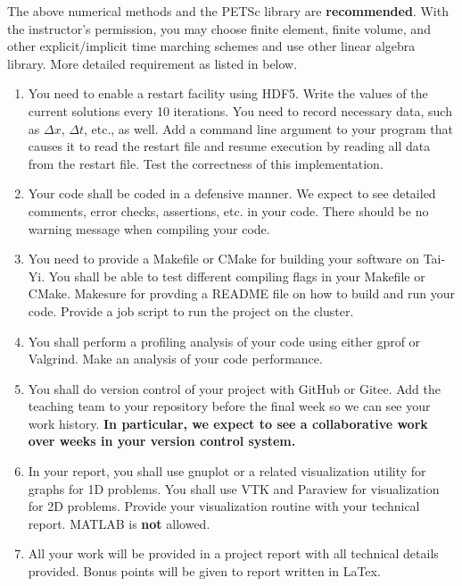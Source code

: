 \documentclass[12pt]{article}
\begin{document}
The above numerical methods and the PETSc library are \textbf{recommended}. With the instructor's permission, you may choose finite element, finite volume, and other explicit/implicit time marching schemes and use other linear algebra library. More detailed requirement as listed in below.

\begin{enumerate}
\item You need to enable a restart facility using HDF5. Write the values of the current solutions every 10 iterations. You need to record necessary data, such as $\Delta x$, $\Delta t$, etc., as well. Add a command line argument to your program that causes it to read the restart file and resume execution by reading all data from the restart file. Test the correctness of this implementation.

\item Your code shall be coded in a defensive manner. We expect to see detailed comments, error checks, assertions, etc. in your code. There should be no warning message when compiling your code.

\item You need to provide a Makefile or CMake for building your software on Tai-Yi. You shall be able to test different compiling flags in your Makefile or CMake. Makesure for provding a README file on how to build and run your code. Provide a job script to run the project on the cluster.

\item You shall perform a profiling analysis of your code using either gprof or Valgrind. Make an analysis of your code performance.


\item You shall do version control of your project with GitHub or Gitee. Add the teaching team to your repository before the final week so we can see your work history. \textbf{In particular, we expect to see a collaborative work over weeks in your version control system.}

\item In your report, you shall use gnuplot or a related visualization utility for graphs for 1D problems. You shall use VTK and Paraview for visualization for 2D problems. Provide your visualization routine with your technical report. MATLAB is \textbf{not} allowed.

\item All your work will be provided in a project report with all technical details provided. Bonus points will be given to report written in LaTex.
\end{enumerate}
\end{document}
